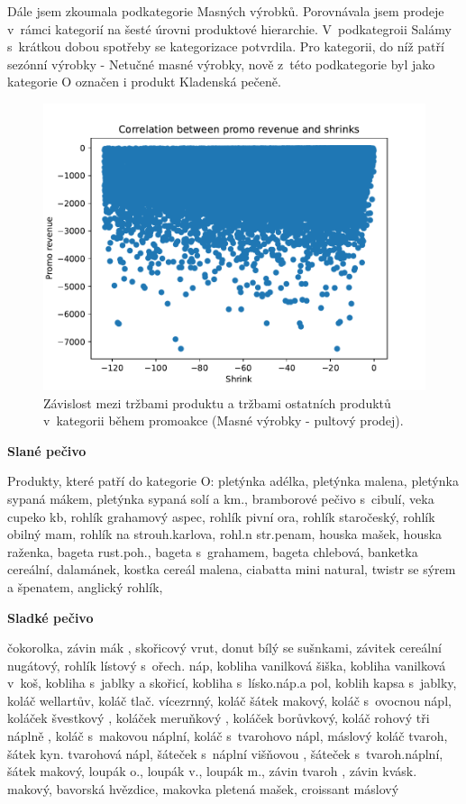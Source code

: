 Dále jsem zkoumala podkategorie Masných výrobků. Porovnávala jsem prodeje v~rámci kategorií na šesté úrovni produktové hierarchie. V~podkategroii Salámy s~krátkou dobou spotřeby se kategorizace potvrdila. Pro kategorii, do níž patří sezónní výrobky - Netučné masné výrobky, nově z~této podkategorie byl jako kategorie O označen i produkt Kladenská pečeně.

\begin{figure}[hbtp!]
    \centering
    \captionsetup{justification=centering}
    \includegraphics[width=\textwidth]{obrazky/grafy/categorization_charts/categorization_charts_L4_PROC MEAT SERVICE.pdf}
    \caption{Závislost mezi tržbami produktu a tržbami ostatních produktů v~kategorii během promoakce (Masné výrobky - pultový prodej).}
    \label{obr:ctg:g:graf}
\end{figure}

\textbf{Slané pečivo}

Produkty, které patří do kategorie O:
pletýnka adélka, pletýnka malena, pletýnka sypaná mákem, pletýnka sypaná solí a km., bramborové pečivo s~cibulí, veka cupeko kb, rohlík grahamový aspec, rohlík pivní ora, rohlík staročeský, rohlík obilný mam, rohlík na strouh.karlova, rohl.n str.penam, houska mašek, houska raženka, bageta rust.poh., bageta s~grahamem, bageta chlebová, banketka cereální, dalamánek, kostka cereál malena, ciabatta mini natural, twistr se sýrem a špenatem, anglický rohlík, 

\textbf{Sladké pečivo}

čokorolka, závin mák , skořicový vrut, donut bílý se sušnkami, závitek cereální nugátový, rohlík lístový s~ořech. náp, kobliha vanilková šiška, kobliha vanilková v~koš, kobliha s~jablky a skořicí, kobliha s~lísko.náp.a pol, koblih kapsa s~jablky, koláč wellartův, koláč tlač. vícezrnný, koláč šátek makový, koláč s~ovocnou nápl, koláček švestkový , koláček meruňkový , koláček borůvkový, koláč rohový tři náplně , koláč s~makovou náplní, koláč s~tvarohovo nápl, máslový koláč tvaroh, šátek kyn. tvarohová nápl, šáteček s~náplní višňovou , šáteček s~tvaroh.náplní, šátek makový, loupák o., loupák v., loupák m., závin tvaroh , závin kvásk. makový, bavorská hvězdice, makovka pletená mašek, croissant máslový

